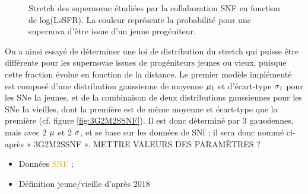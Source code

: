 \documentclass[a4paper, 12pt, svgnames]{article}
\begin{document}
\begin{figure}[htbp!]
    \centering
    \captionsetup{justification=centering}
    \caption{Stretch des supernovae étudiées par la collaboration SNF en
    fonction de log(LsSFR). La couleur représente la probabilité pour une
supernova d'être issue d'un jeune progéniteur.}
\end{figure}

On a ainsi essayé de déterminer une loi de distribution du stretch qui puisse
être différente pour les supernovae issues de progéniteurs jeunes ou vieux,
puisque cette fraction évolue en fonction de la distance. Le premier modèle
implémenté est composé d'une distribution gaussienne de moyenne $\mu_1$ et
d'écart-type $\sigma_1$ pour les SNe Ia jeunes, et de la combinaison de deux
distributions gaussiennes pour les SNe Ia vieilles, dont la première est de même
moyenne et écart-type que la première (cf. figure \ref{fig:3G2M2SSNF}). Il est
donc déterminé par 3 gaussiennes, mais avec 2 $\mu$ et 2 $\sigma$, et se base sur les
données de SNf ; il sera donc nommé ci-après « 3G2M2SSNF ». METTRE VALEURS DES
PARAMÈTRES ?

\begin{itemize}
    \item Données \textcolor{orange}{SNF} ;
    \item Définition jeune/vieille d'après  2018
\end{itemize}
\end{document}
